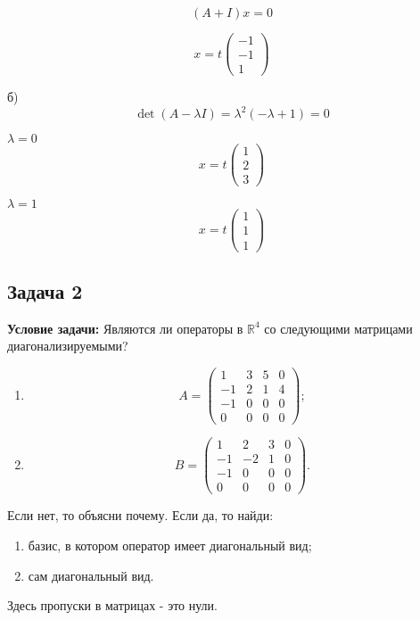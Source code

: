 \documentclass[a4paper,12pt]{article}
\begin{document}
\[
(A+I)x = 0
\]

\[
x = t \begin{pmatrix}
    -1 \\
    -1 \\
    1
\end{pmatrix}
\]

б) 
\[
\det(A-\lambda I) = \lambda^2(-\lambda + 1) = 0
\]

$\lambda = 0$
\[
x = t \begin{pmatrix}
    1 \\
    2 \\
    3
\end{pmatrix}
\]

$\lambda = 1$
\[
x = t \begin{pmatrix}
    1 \\ 
    1 \\
    1 
\end{pmatrix}
\]

\subsection{Задача 2}
\textbf{Условие задачи:} Являются ли операторы в $\mathbb{R}^4$ со следующими матрицами диагонализируемыми?
\begin{enumerate}
    \item 
    \[
    A =
    \begin{pmatrix}
    1 & 3 & 5 & 0 \\
    -1 & 2 & 1 & 4 \\
    -1 & 0 & 0 & 0 \\
    0 & 0 & 0 & 0
    \end{pmatrix};
    \]
    \item 
    \[
    B =
    \begin{pmatrix}
    1 & 2 & 3 & 0 \\
    -1 & -2 & 1 & 0 \\
    -1 & 0 & 0 & 0 \\
    0 & 0 & 0 & 0
    \end{pmatrix}.
    \]
\end{enumerate}
Если нет, то объясни почему. Если да, то найди:
\begin{enumerate}
    \item базис, в котором оператор имеет диагональный вид;
    \item сам диагональный вид.
\end{enumerate}
Здесь пропуски в матрицах - это нули.
\end{document}
